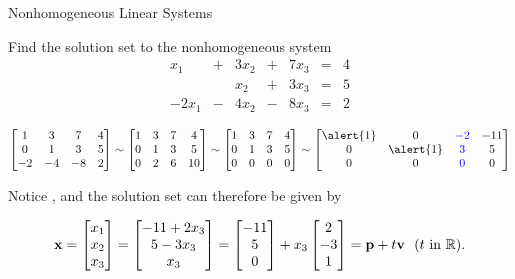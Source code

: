 \documentclass[xcolor=dvipsnames,aspectratio=169,t]{beamer}
\begin{document}
\begin{frame}{Nonhomogeneous Linear Systems}
\medskip

  Find the solution set to the \alert{nonhomogeneous} system
  \[
  \begin{array}{ccccccc}
    x_1 & + & 3x_2 & + &7 x_3&=&4\\
    &  & x_2 & + & 3x_3 &=& 5\\
  -2x_1 & - & 4x_2 & - & 8x_3 &=& 2
  \end{array}  \]
  
  \pause
  \[ \bbm 1 & 3 & 7 & 4\\
  0 & 1 & 3 & 5\\
  -2 & -4 & -8 & 2 \ebm \sim
  \bbm 1 & 3 & 7 & 4\\
  0 & 1 & 3 & 5\\
  0 & 2 & 6 & 10 \ebm \sim
  \bbm 1 & 3 & 7 & 4\\
  0 & 1 & 3 & 5\\
  0 & 0 & 0 & 0 \ebm \sim
  \bbm \alert{1} & 0 & \colorb{-2} & -11\\
  0 & \alert{1} & \colorb{3} & 5\\
  0 & 0 & \colorb{0} & 0 \ebm \]
  \medskip

  Notice , and the solution set can therefore be given by

  \[ \mathbf{x} = \begin{bmatrix} x_1 \\ x_2 \\ x_3 \end{bmatrix} = \begin{bmatrix} -11+2x_3 \\ 5-3x_3 \\ x_3 \end{bmatrix} =  \begin{bmatrix} -11 \\ 5 \\ 0 \end{bmatrix} +  x_3 \begin{bmatrix} 2 \\ -3 \\ 1 \end{bmatrix} = \mathbf{p} + t \mathbf{v} \ \ (t \mbox{ in } \mathbb{R}) . \]
\end{frame}
\end{document}
